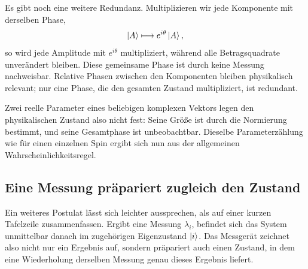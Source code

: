 \begin{classroomqa}
\end{classroomqa}

Es gibt noch eine weitere Redundanz. Multiplizieren wir jede Komponente mit derselben Phase,
\begin{equation}
\left\lvert A\right\rangle\longmapsto e^{i\theta}\left\lvert A\right\rangle,
\label{eq:l3-global-phase}
\end{equation}
so wird jede Amplitude mit \(e^{i\theta}\) multipliziert, während alle Betragsquadrate unverändert bleiben. Diese gemeinsame Phase ist durch keine Messung nachweisbar. Relative Phasen zwischen den Komponenten bleiben physikalisch relevant; nur eine Phase, die den gesamten Zustand multipliziert, ist redundant.

Zwei reelle Parameter eines beliebigen komplexen Vektors legen den physikalischen Zustand also nicht fest: Seine Größe ist durch die Normierung bestimmt, und seine Gesamtphase ist unbeobachtbar. Dieselbe Parameterzählung wie für einen einzelnen Spin ergibt sich nun aus der allgemeinen Wahrscheinlichkeitsregel.

\subsection{Eine Messung präpariert zugleich den Zustand}

Ein weiteres Postulat lässt sich leichter aussprechen, als auf einer kurzen Tafelzeile zusammenfassen. Ergibt eine Messung \(\lambda_i\), befindet sich das System unmittelbar danach im zugehörigen Eigenzustand \(\left\lvert i\right\rangle\). Das Messgerät zeichnet also nicht nur ein Ergebnis auf, sondern präpariert auch einen Zustand, in dem eine Wiederholung derselben Messung genau dieses Ergebnis liefert.

\begin{classroomqa}
\end{classroomqa}

